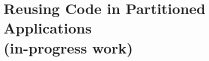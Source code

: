 \declarecommand{\sysname}{\civet{}}

\chapter{Reusing Code in Partitioned Applications\\ (in-progress work)}
\label{chap:civet}






%

